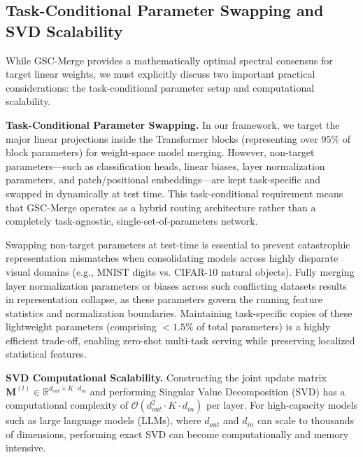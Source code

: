\subsection{Task-Conditional Parameter Swapping and SVD Scalability}
\label{subsec:limitations_scalability}

While GSC-Merge provides a mathematically optimal spectral consensus for target linear weights, we must explicitly discuss two important practical considerations: the task-conditional parameter setup and computational scalability.

\textbf{Task-Conditional Parameter Swapping.} In our framework, we target the major linear projections inside the Transformer blocks (representing over $95\%$ of block parameters) for weight-space model merging. However, non-target parameters—such as classification heads, linear biases, layer normalization parameters, and patch/positional embeddings—are kept task-specific and swapped in dynamically at test time. This task-conditional requirement means that GSC-Merge operates as a hybrid routing architecture rather than a completely task-agnostic, single-set-of-parameters network. 

Swapping non-target parameters at test-time is essential to prevent catastrophic representation mismatches when consolidating models across highly disparate visual domains (e.g., MNIST digits vs. CIFAR-10 natural objects). Fully merging layer normalization parameters or biases across such conflicting datasets results in representation collapse, as these parameters govern the running feature statistics and normalization boundaries. Maintaining task-specific copies of these lightweight parameters (comprising $<1.5\%$ of total parameters) is a highly efficient trade-off, enabling zero-shot multi-task serving while preserving localized statistical features.

\textbf{SVD Computational Scalability.} Constructing the joint update matrix $\mathbf{M}^{(l)} \in \mathbb{R}^{d_{out} \times K \cdot d_{in}}$ and performing Singular Value Decomposition (SVD) has a computational complexity of $\mathcal{O}(d_{out}^2 \cdot K \cdot d_{in})$ per layer. For high-capacity models such as large language models (LLMs), where $d_{out}$ and $d_{in}$ can scale to thousands of dimensions, performing exact SVD can become computationally and memory intensive.

